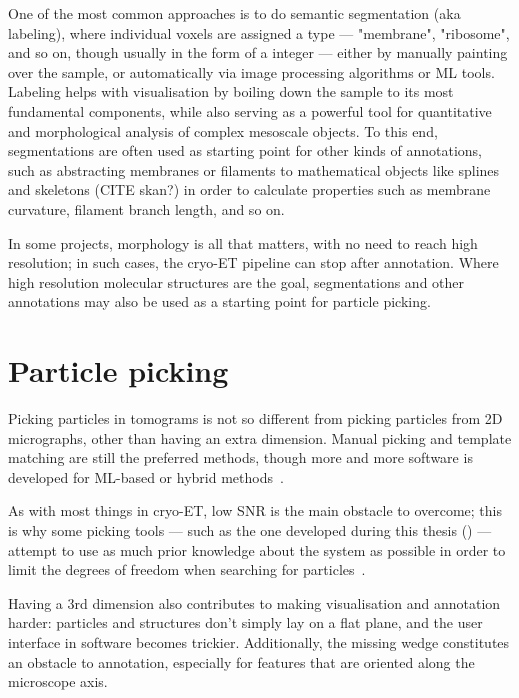 One of the most common approaches is to do semantic segmentation (aka labeling), where individual voxels are assigned a type --- "membrane", "ribosome", and so on, though usually in the form of a integer --- either by manually painting over the sample, or automatically via image processing algorithms or ML tools.
Labeling helps with visualisation by boiling down the sample to its most fundamental components, while also serving as a powerful tool for quantitative and morphological analysis of complex mesoscale objects.
To this end, segmentations are often used as starting point for other kinds of annotations, such as abstracting membranes or filaments to mathematical objects like splines and skeletons (CITE skan?) in order to calculate properties such as membrane curvature, filament branch length, and so on.

In some projects, morphology is all that matters, with no need to reach high resolution; in such cases, the cryo-ET pipeline can stop after annotation.
Where high resolution molecular structures are the goal, segmentations and other annotations may also be used as a starting point for particle picking.

\section{Particle picking}\label{et_particle_picking}
Picking particles in tomograms is not so different from picking particles from 2D micrographs, other than having an extra dimension.
Manual picking and template matching are still the preferred methods, though more and more software is developed for ML-based or hybrid methods~\cite{wagnerSPHIREcrYOLOFastAccurate2019,wagnerEvolutionSPHIREcrYOLOParticle2020,riceTomoTwinGeneralized3D2023,liuDeepETPickerFastAccurate2024}.

As with most things in cryo-ET, low SNR is the main obstacle to overcome; this is why some picking tools --- such as the one developed during this thesis () --- attempt to use as much prior knowledge about the system as possible in order to limit the degrees of freedom when searching for particles~\cite{castano-diezDynamoCatalogueGeometrical2017,wagnerEvolutionSPHIREcrYOLOParticle2020,gaifasBlikExtensible3D2024}.

Having a 3rd dimension also contributes to making visualisation and annotation harder: particles and structures don't simply lay on a flat plane, and the user interface in software becomes trickier.
Additionally, the missing wedge constitutes an obstacle to annotation, especially for features that are oriented along the microscope axis.

